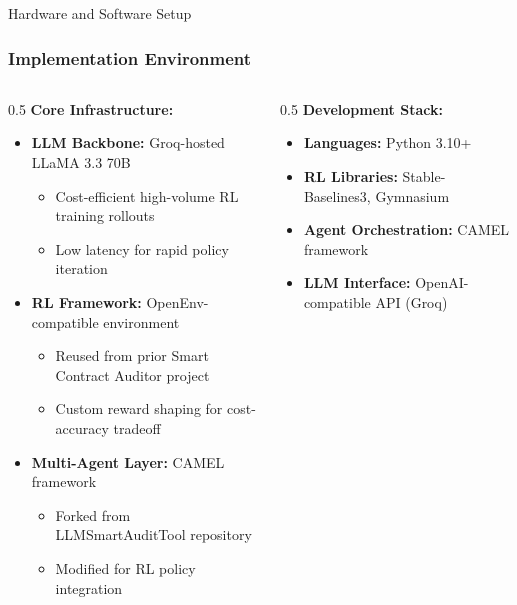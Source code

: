 \documentclass[aspectratio=169]{beamer}
\begin{document}
\begin{frame}{Hardware and Software Setup}
\frametitle{Implementation Environment}

\begin{columns}[T]
\begin{column}{0.5\textwidth}
\textbf{Core Infrastructure:}
\begin{itemize}
    \item \textbf{LLM Backbone:} Groq-hosted LLaMA 3.3 70B
    \begin{itemize}
        \item Cost-efficient high-volume RL training rollouts
        \item Low latency for rapid policy iteration
    \end{itemize}
    
    \item \textbf{RL Framework:} OpenEnv-compatible environment
    \begin{itemize}
        \item Reused from prior Smart Contract Auditor project
        \item Custom reward shaping for cost-accuracy tradeoff
    \end{itemize}
    
    \item \textbf{Multi-Agent Layer:} CAMEL framework
    \begin{itemize}
        \item Forked from LLMSmartAuditTool repository
        \item Modified for RL policy integration
    \end{itemize}
\end{itemize}
\end{column}

\begin{column}{0.5\textwidth}
\textbf{Development Stack:}
\begin{itemize}
    \item \textbf{Languages:} Python 3.10+
    \item \textbf{RL Libraries:} Stable-Baselines3, Gymnasium
    \item \textbf{Agent Orchestration:} CAMEL framework
    \item \textbf{LLM Interface:} OpenAI-compatible API (Groq)
\end{itemize}

\vspace{0.5cm}


\end{column}
\end{columns}
\end{frame}
\end{document}
